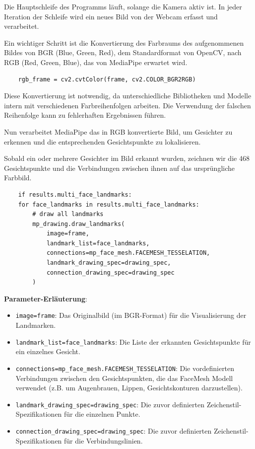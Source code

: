 Die Hauptschleife des Programms läuft, solange die Kamera aktiv ist. In jeder Iteration der Schleife wird ein neues Bild von der Webcam erfasst und verarbeitet.

Ein wichtiger Schritt ist die Konvertierung des Farbraums des aufgenommenen Bildes von BGR (Blue, Green, Red), dem Standardformat von OpenCV, nach RGB (Red, Green, Blue), das von MediaPipe erwartet wird.
\begin{lstlisting}
    rgb_frame = cv2.cvtColor(frame, cv2.COLOR_BGR2RGB)
\end{lstlisting}
Diese Konvertierung ist notwendig, da unterschiedliche Bibliotheken und Modelle intern mit verschiedenen Farbreihenfolgen arbeiten. Die Verwendung der falschen Reihenfolge kann zu fehlerhaften Ergebnissen führen.

Nun verarbeitet MediaPipe das in RGB konvertierte Bild, um Gesichter zu erkennen und die entsprechenden Gesichtspunkte zu lokalisieren.

Sobald ein oder mehrere Gesichter im Bild erkannt wurden, zeichnen wir die 468 Gesichtspunkte und die Verbindungen zwischen ihnen auf das ursprüngliche Farbbild.
\begin{lstlisting}
    if results.multi_face_landmarks:
    for face_landmarks in results.multi_face_landmarks:
        # draw all landmarks
        mp_drawing.draw_landmarks(
            image=frame,
            landmark_list=face_landmarks,
            connections=mp_face_mesh.FACEMESH_TESSELATION,
            landmark_drawing_spec=drawing_spec,
            connection_drawing_spec=drawing_spec
        )
\end{lstlisting}
\textbf{Parameter-Erläuterung}:
\begin{itemize}
    \item \texttt{image=frame}: Das Originalbild (im BGR-Format) für die Visualisierung der Landmarken.
    \item \texttt{landmark\_list=face\_landmarks}: Die Liste der erkannten Gesichtspunkte für ein einzelnes Gesicht.
    \item \texttt{connections=mp\_face\_mesh.FACEMESH\_TESSELATION}: Die vordefinierten Verbindungen zwischen den Gesichtspunkten, die das FaceMesh Modell verwendet (z.B. um Augenbrauen, Lippen, Gesichtskonturen darzustellen).
    \item \texttt{landmark\_drawing\_spec=drawing\_spec}: Die zuvor definierten Zeichenstil-Spezifikationen für die einzelnen Punkte.
    \item \texttt{connection\_drawing\_spec=drawing\_spec}: Die zuvor definierten Zeichenstil-Spezifikationen für die Verbindungslinien.
\end{itemize}

